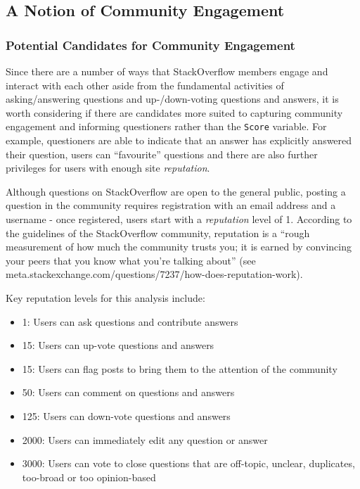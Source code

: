 \documentclass[11pt,preprint, authoryear]{article}
\begin{document}
\subsection{\texorpdfstring{A Notion of Community Engagement
\label{comgage}}{A Notion of Community Engagement }}\label{a-notion-of-community-engagement}

\subsubsection{\texorpdfstring{Potential Candidates for Community
Engagement
\label{Vars}}{Potential Candidates for Community Engagement }}\label{potential-candidates-for-community-engagement}

Since there are a number of ways that StackOverflow members engage and
interact with each other aside from the fundamental activities of
asking/answering questions and up-/down-voting questions and answers, it
is worth considering if there are candidates more suited to capturing
community engagement and informing questioners rather than the
\texttt{Score} variable. For example, questioners are able to indicate
that an answer has explicitly answered their question, users can
``favourite'' questions and there are also further privileges for users
with enough site \emph{reputation}.

Although questions on StackOverflow are open to the general public,
posting a question in the community requires registration with an email
address and a username - once registered, users start with a
\emph{reputation} level of 1. According to the guidelines of the
StackOverflow community, reputation is a ``rough measurement of how much
the community trusts you; it is earned by convincing your peers that you
know what you're talking about'' (see
meta.stackexchange.com/questions/7237/how-does-reputation-work).

\newpage

Key reputation levels for this analysis include:


\begin{itemize}
\item
  1: Users can ask questions and contribute answers
\item
  15: Users can up-vote questions and answers
\item
  15: Users can flag posts to bring them to the attention of the
  community
\item
  50: Users can comment on questions and answers
\item
  125: Users can down-vote questions and answers
\item
  2000: Users can immediately edit any question or answer
\item
  3000: Users can vote to close questions that are off-topic, unclear,
  duplicates, too-broad or too opinion-based
\end{itemize}
\end{document}

